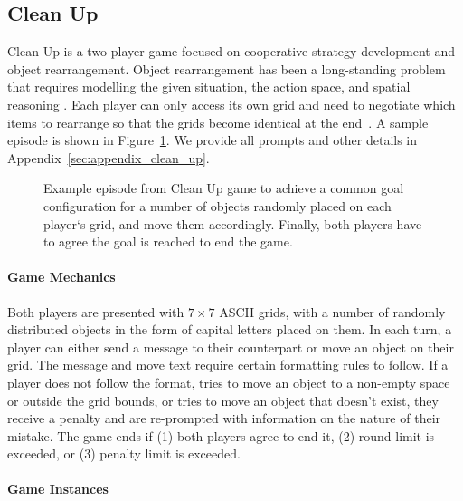 \documentclass[11pt]{article}
\begin{document}
\subsection{Clean Up}

Clean Up is a two-player game focused on cooperative strategy development and object rearrangement. Object rearrangement has been a long-standing problem that requires modelling the given situation, the action space, and spatial reasoning \cite{DBLP:journals/corr/abs-2011-01975,DBLP:journals/ral/ZengWYZDCD24,DBLP:journals/access/KhanQCASR25}. Each player can only access its own grid and need to negotiate which items to rearrange so that the grids become identical at the end~\cite{DBLP:conf/sigdial/JeknicSK24}. A sample episode is shown in Figure~\ref{fig:clean_up_example}. We provide all prompts and other details in Appendix~\ref{sec:appendix_clean_up}.

\begin{figure}[ht!]
    \centering
    
    \caption{Example episode from Clean Up game to achieve a common goal configuration for a number of objects randomly placed on each player`s grid, and move them accordingly. Finally, both players have to agree the goal is reached to end the game.}
    
    \label{fig:clean_up_example}
\end{figure}

\paragraph{Game Mechanics} Both players are presented with $7\times7$ ASCII grids, with a number of randomly distributed objects in the form of capital letters placed on them. In each turn, a player can either send a message to their counterpart or move an object on their grid. The message and move text require certain formatting rules to follow. If a player does not follow the format, tries to move an object to a non-empty space or outside the grid bounds, or tries to move an object that doesn't exist, they receive a penalty and are re-prompted with information on the nature of their mistake. The game ends if (1) both players agree to end it, (2) round limit is exceeded, or (3) penalty limit is exceeded.




\paragraph{Game Instances}
\end{document}
